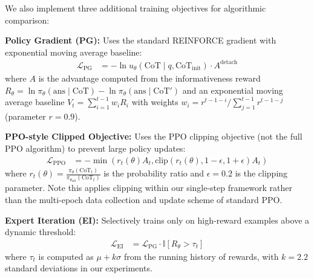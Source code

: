 \documentclass{article} %
\begin{document}
We also implement three additional training objectives for algorithmic comparison:

\textbf{Policy Gradient (PG):} Uses the standard REINFORCE gradient with exponential moving average baseline:
\begin{align}
\mathcal{L}_{\text{PG}} &= -\ln u_\theta(\text{CoT} \mid q, \text{CoT}_{\text{init}}) \cdot A^{\text{detach}}
\end{align}
where $A$ is the advantage computed from the informativeness reward $R_\theta = \ln \pi_\theta(\text{ans} \mid \text{CoT}) - \ln \pi_\theta(\text{ans} \mid \text{CoT}')$ and an exponential moving average baseline $V_t = \sum_{i=1}^{t-1} w_i R_i$ with weights $w_i = r^{t-1-i} / \sum_{j=1}^{t-1} r^{t-1-j}$ (parameter $r = 0.9$).

\textbf{PPO-style Clipped Objective:} Uses the PPO clipping objective (not the full PPO algorithm) to prevent large policy updates:
\begin{align}
\mathcal{L}_{\text{PPO}} &= -\min(r_t(\theta) A_t, \text{clip}(r_t(\theta), 1-\epsilon, 1+\epsilon) A_t)
\end{align}
where $r_t(\theta) = \frac{\pi_\theta(\text{CoT}_t)}{\pi_{\theta_{\text{old}}}(\text{CoT}_t)}$ is the probability ratio and $\epsilon = 0.2$ is the clipping parameter. Note this applies clipping within our single-step framework rather than the multi-epoch data collection and update scheme of standard PPO.

\textbf{Expert Iteration (EI):} Selectively trains only on high-reward examples above a dynamic threshold:
\begin{align}
\mathcal{L}_{\text{EI}} &= \mathcal{L}_{\text{PG}} \cdot \mathbb{I}[R_\theta > \tau_t]
\end{align}
where $\tau_t$ is computed as $\mu + k\sigma$ from the running history of rewards, with $k = 2.2$ standard deviations in our experiments.
\end{document}
